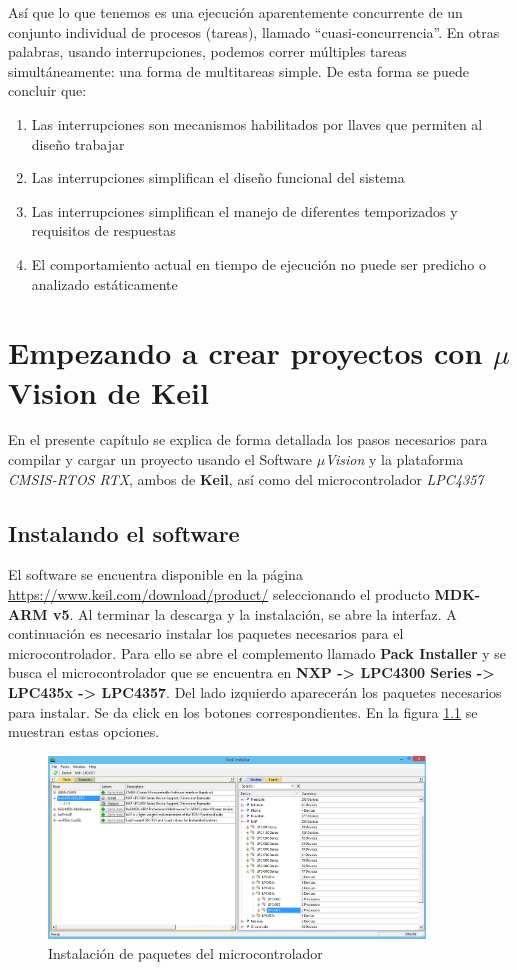 \documentclass[12pt, twoside]{report}
\begin{document}
Así que lo que tenemos es una ejecución aparentemente concurrente de un conjunto individual de procesos (tareas), llamado ``cuasi-concurrencia''. En otras palabras, usando interrupciones, podemos correr múltiples tareas simultáneamente: una forma de multitareas simple. De esta forma se puede concluir que:

\begin{enumerate}
	\item Las interrupciones son mecanismos habilitados por llaves que permiten al diseño trabajar
	\item Las interrupciones simplifican el diseño funcional del sistema
	\item Las interrupciones simplifican el manejo de diferentes temporizados y requisitos de respuestas
	\item El comportamiento actual en tiempo de ejecución no puede ser predicho o analizado estáticamente
\end{enumerate}

\chapter{Empezando a crear proyectos con $ \mu $Vision de Keil}

En el presente capítulo se explica de forma detallada los pasos necesarios para compilar y cargar un proyecto usando el Software  \textit{$\mu $Vision}  y la plataforma \textit{CMSIS-RTOS RTX}, ambos de \textbf{Keil}, así como del microcontrolador \textit{LPC4357} 

\section{Instalando el software}

El software se encuentra disponible en la página \url{https://www.keil.com/download/product/} seleccionando el producto \textbf{MDK-ARM v5}. Al terminar la descarga y la instalación, se abre la interfaz. A continuación es necesario instalar los paquetes necesarios para el microcontrolador. Para ello se abre el complemento llamado \textbf{Pack Installer} y se busca el microcontrolador que se encuentra en \textbf{NXP -> LPC4300 Series -> LPC435x -> LPC4357}. Del lado izquierdo aparecerán los paquetes necesarios para instalar. Se da click en los botones correspondientes. En la figura \ref{cap1:001} se muestran estas opciones.

\begin{figure}[H]
	\centering
	\includegraphics[width=100mm]{paqmicro}
	\caption{Instalación de paquetes del microcontrolador}
	\label{cap1:001}
\end{figure}
\end{document}
